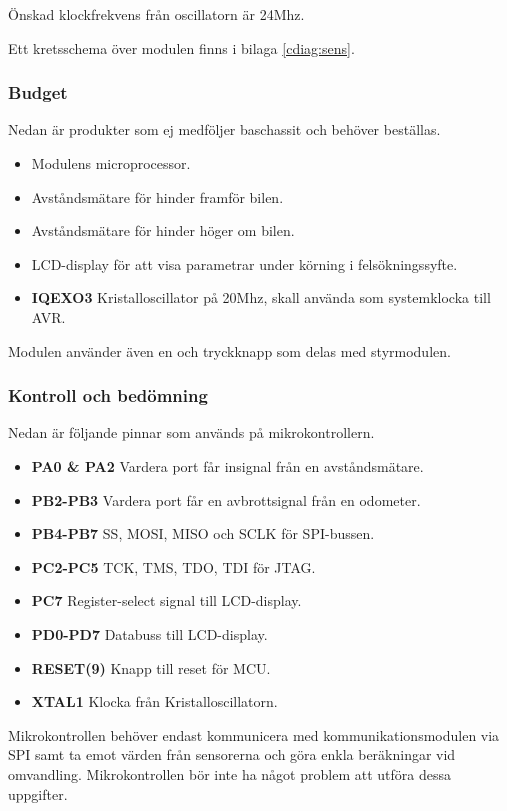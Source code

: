 \documentclass[designspec/spec.tex]{subfiles}
\begin{document}
Önskad klockfrekvens från oscillatorn är 24Mhz.

Ett kretsschema över modulen finns i bilaga \ref{cdiag:sens}.

\subsubsection{Budget}
Nedan är produkter som ej medföljer baschassit och behöver beställas.
\begin{itemize}
	\item \textbf{\modMicrocontroller} Modulens microprocessor. 
    \item \textbf{\modDistf} Avståndsmätare för hinder framför bilen.
    \item \textbf{\modDists} Avståndsmätare för hinder höger om bilen.
    \item \textbf{\modLcd} LCD-display för att visa parametrar under körning
    i felsökningssyfte.
    \item \textbf{IQEXO3} Kristalloscillator på 20Mhz, skall använda som systemklocka till AVR.
\end{itemize}
Modulen använder även en {\modJtag} och tryckknapp som delas med styrmodulen.

\subsubsection{Kontroll och bedömning}
Nedan är följande pinnar som används på mikrokontrollern.
\begin{itemize}
   \item \textbf{PA0 \& PA2} Vardera port får insignal från en avståndsmätare.
   \item \textbf{PB2-PB3} Vardera port får en avbrottsignal från en odometer.
   \item \textbf{PB4-PB7} SS, MOSI, MISO och SCLK för SPI-bussen.
   \item \textbf{PC2-PC5} TCK, TMS, TDO, TDI för JTAG.
   \item \textbf{PC7} Register-select signal till LCD-display.
   \item \textbf{PD0-PD7} Databuss till LCD-display.
   \item \textbf{RESET(9)} Knapp till reset för MCU.
   \item \textbf{XTAL1} Klocka från Kristalloscillatorn.
\end{itemize}
Mikrokontrollen behöver endast kommunicera med kommunikationsmodulen via SPI
samt ta emot värden från sensorerna och göra enkla beräkningar vid omvandling.
Mikrokontrollen bör inte ha något problem att utföra dessa uppgifter.
\end{document}
